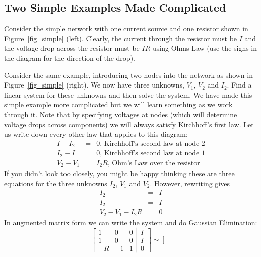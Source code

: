 \subsection{Two Simple Examples Made Complicated}

Consider the simple network with one current source and one resistor 
shown in Figure~\ref{fig_simple} (left). Clearly, the current 
through the resistor must be $I$ and the voltage drop across the 
resistor must be $IR$ using Ohms Law (use the signs in the diagram 
for the direction of the drop). 


\begin{example}
\label{Ex:simple1} 
Consider the same example, introducing two nodes into the network 
as shown in Figure~\ref{fig_simple} (right). We now have three unknowns, 
$V_1$, $V_2$ and $I_2$. Find a linear system for these unknowns 
and then solve the system.
{\rm We have made this simple example more complicated 
but we will learn something as we work through it. Note that by specifying 
voltages at nodes (which will determine voltage drops across components)
we will always satisfy Kirchhoff's first law. Let us write down every other 
law that applies to this diagram:
\begin{eqnarray*}
I - I_2 & = & 0 \mbox{,\ \ Kirchhoff's second law at node 2} \\
I_2 - I & = & 0 \mbox{,\ \ Kirchhoff's second law at node 1} \\
V_2 - V_1 & = & I_2 R \mbox{,\ \ Ohm's Law over the resistor} 
\end{eqnarray*}
If you didn't look too closely, you might be happy thinking these 
are three equations for the three unknowns $I_2$, $V_1$ and $V_2$. 
However, rewriting gives 
\begin{eqnarray*}
I_2 & = & I \\
I_2 & = & I \\
V_2 - V_1 - I_2 R & = & 0 
\end{eqnarray*}
In augmented matrix form we can write the system and do Gaussian 
Elimination:
\[
\left[
\begin{array}{ccc}
1 & 0 & 0 \\
1 & 0 & 0 \\
-R & -1 & 1 
\end{array}
\right|
\left.
\begin{array}{ccc}
I \\ I \\ 0 
\end{array}
\right]
\sim 
\left[
\begin{array}{ccc}

\end{array}\]}
\end{example}
